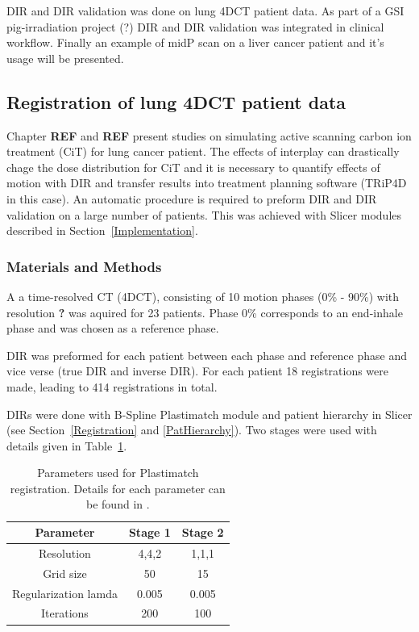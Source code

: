 \documentclass[type=dr, dr=rernat, accentcolor=tud7b,colorbacktitle, bigchapter, openright, twoside, 12pt ]{tudthesis}
\begin{document}
DIR and DIR validation was done on lung 4DCT patient data. As part of a GSI pig-irradiation project (?) DIR and DIR validation was integrated in clinical workflow. Finally an example of midP scan on a liver cancer patient and it's usage will be presented.

\subsection{Registration of lung 4DCT patient data}

Chapter \textbf{REF} and \textbf{REF} present studies on simulating active scanning carbon ion treatment (CiT) for lung cancer patient. The effects of interplay can drastically chage the dose distribution for CiT and it is necessary to quantify effects of motion with DIR and transfer results into
treatment planning software (TRiP4D in this case). An automatic procedure is required to preform DIR and DIR validation on a large number of patients. This was achieved with Slicer modules described in Section~\ref{Implementation}.

\subsubsection{Materials and Methods}

A a time-resolved CT (4DCT), consisting of 10 motion phases (0\% - 90\%) with resolution \textbf{?} was aquired for 23 patients.
Phase 0\% corresponds to an end-inhale phase and was chosen as a reference phase.

DIR was preformed for each patient between each phase and reference phase and vice verse (true DIR and inverse DIR). For each patient 18 registrations were made, leading to 414 registrations in total.

DIRs were done with B-Spline Plastimatch module and patient hierarchy in Slicer (see Section~\ref{Registration} and \ref{PatHierarchy}). Two stages were used with details given in Table~\ref{tab:stages}. 

\begin{table}[H]
  \centering
  \caption{Parameters used for Plastimatch registration. Details for each parameter can be found in \cite{Plastimatch}.}
  \begin{tabular}{c|c|c}
      Parameter & Stage 1 & Stage 2 \\
      \hline
      Resolution & 4,4,2 & 1,1,1 \\
      Grid size & 50 & 15 \\
      Regularization lamda & 0.005 & 0.005 \\
      Iterations & 200 & 100 \\
    \hline\hline
  \end{tabular}
  \label{tab:stages}
\end{table}
\end{document}
